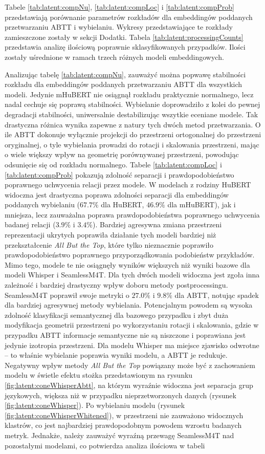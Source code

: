 Tabele \ref{tab:latent:compNu}, \ref{tab:latent:compLoc} i \ref{tab:latent:compProb} przedstawiają porównanie parametrów rozkładów dla embeddingów poddanych przetwarzaniu ABTT i wybielaniu. Wykresy przedstawiające te rozkłady zamieszczone zostały w sekcji Dodatki. Tabela \ref{tab:latent:processingCounts} przedstawia analizę ilościową poprawnie sklasyfikowanych przypadków. Ilości zostały uśrednione w ramach trzech różnych modeli embeddingowych.

Analizując tabelę \ref{tab:latent:compNu}, zauważyć można popwawę stabilności rozkładu dla embeddingów poddanych przetwarzaniu ABTT dla wszystkich modeli. Jedynie mHuBERT nie osiągnął rozkładu praktycznie normalnego, lecz nadal cechuje się poprawą stabilności. Wybielanie doprowadziło z kolei do pewnej degradacji stabilności, uniwersalnie destabilizując wszytkie eceniane modele. Tak drastyczna różnica wynika zapewne z natury tych dwóch metod przetwarzania. O ile ABTT dokonuje wyłącznie projekcji do przestrzeni ortogonalnej do przestrzeni oryginalnej, o tyle wybielania prowadzi do rotacji i skalowania przestrzeni, mając o wiele większy wpływ na geometrię porównywanej przestrzeni, powodując odsunięcie się od rozkładu normalnego. Tabele \ref{tab:latent:compLoc} i \ref{tab:latent:compProb} pokazują zdolność separacji i prawdopodobieństwo poprawnego uchwycenia relacji przez modele. W modelach z rodziny HuBERT widoczna jest drastyczna poprawa zdolności separacji dla embeddingów poddanych wybielaniu ($67.7\%$ dla HuBERT, $46.9\%$ dla mHuBERT), jak i mniejsza, lecz zauważalna poprawa prawdopodobieństwa poprawnego uchwycenia badanej relacji ($3.9\%$ i $3.4\%$). Bardziej agresywna zmiana przestrzeni reprezentacji ukrytych poprawiła działanie tych modeli bardziej niż przekształcenie \textit{All But the Top}, które tylko nieznacznie poprawiło prawdopodobieństwo poprawnego przyporządkowania podobieństw przykładów. Mimo tego, modele te nie osiągnęły wyników większych niż wyniki bazowe dla modeli Whisper i SeamlessM4T. Dla tych dwóch modeli widoczna jest zgoła inna zależność i bardziej drastyczny wpływ doboru metody postprocessingu. SeamlessM4T poprawił swoje metryki o $27.0\%$ i $9.8\%$ dla ABTT, notując spadek dla bardziej agresywnej metody wybielania. Potencjalnym powodem są wysoka zdolność klasyfikacji semantycznej dla bazowego przypadku i zbyt duża modyfikacja geometrii przestrzeni po wykorzystaniu rotacji i skalowania, gdzie w przypadku ABTT informacje semantyczne nie są niszczone i poprawiana jest jedynie izotropia przestrzeni. Dla modelu Whisper ma miejsce zjawisko odwrotne -- to właśnie wybielanie poprawia wyniki modelu, a ABTT je redukuje. Negatywny wpływ metody \textit{All But the Top} powiązany może być z zachowaniem modelu w świetle efektu stożka przedstawionym na rysunku \ref{fig:latent:coneWhisperAbtt}, na którym wyraźnie widoczna jest separacja grup językowych, większa niż w przypadku nieprzetworzonych danych (rysunek \ref{fig:latent:coneWhisper}). Po wybielaniu modelu (rysunek \ref{fig:latent:coneWhisperWhitened}), w przestrzeni nie zauważono widocznych klastrów, co jest najbardziej prawdopodobnym powodem wzrostu badanych metryk. Jednakże, należy zauważyć wyraźną przewagę SeamlessM4T nad pozostałymi modelami, co potwierdza analiza ilościowa w tabeli 